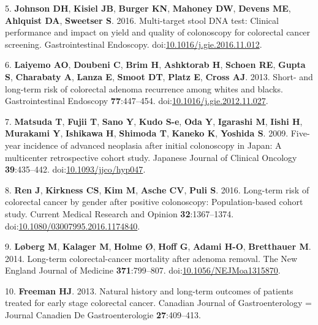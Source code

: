 \documentclass[12pt,]{article}
\begin{document}
\hypertarget{ref-johnson_multi-target_2016}{}
5. \textbf{Johnson DH}, \textbf{Kisiel JB}, \textbf{Burger KN},
\textbf{Mahoney DW}, \textbf{Devens ME}, \textbf{Ahlquist DA},
\textbf{Sweetser S}. 2016. Multi-target stool DNA test: Clinical
performance and impact on yield and quality of colonoscopy for
colorectal cancer screening. Gastrointestinal Endoscopy.
doi:\href{https://doi.org/10.1016/j.gie.2016.11.012}{10.1016/j.gie.2016.11.012}.

\hypertarget{ref-laiyemo_short-_2013}{}
6. \textbf{Laiyemo AO}, \textbf{Doubeni C}, \textbf{Brim H},
\textbf{Ashktorab H}, \textbf{Schoen RE}, \textbf{Gupta S},
\textbf{Charabaty A}, \textbf{Lanza E}, \textbf{Smoot DT}, \textbf{Platz
E}, \textbf{Cross AJ}. 2013. Short- and long-term risk of colorectal
adenoma recurrence among whites and blacks. Gastrointestinal Endoscopy
\textbf{77}:447--454.
doi:\href{https://doi.org/10.1016/j.gie.2012.11.027}{10.1016/j.gie.2012.11.027}.

\hypertarget{ref-matsuda_five-year_2009}{}
7. \textbf{Matsuda T}, \textbf{Fujii T}, \textbf{Sano Y}, \textbf{Kudo
S-e}, \textbf{Oda Y}, \textbf{Igarashi M}, \textbf{Iishi H},
\textbf{Murakami Y}, \textbf{Ishikawa H}, \textbf{Shimoda T},
\textbf{Kaneko K}, \textbf{Yoshida S}. 2009. Five-year incidence of
advanced neoplasia after initial colonoscopy in Japan: A multicenter
retrospective cohort study. Japanese Journal of Clinical Oncology
\textbf{39}:435--442.
doi:\href{https://doi.org/10.1093/jjco/hyp047}{10.1093/jjco/hyp047}.

\hypertarget{ref-ren_long-term_2016}{}
8. \textbf{Ren J}, \textbf{Kirkness CS}, \textbf{Kim M}, \textbf{Asche
CV}, \textbf{Puli S}. 2016. Long-term risk of colorectal cancer by
gender after positive colonoscopy: Population-based cohort study.
Current Medical Research and Opinion \textbf{32}:1367--1374.
doi:\href{https://doi.org/10.1080/03007995.2016.1174840}{10.1080/03007995.2016.1174840}.

\hypertarget{ref-loberg_long-term_2014}{}
9. \textbf{Løberg M}, \textbf{Kalager M}, \textbf{Holme Ø}, \textbf{Hoff
G}, \textbf{Adami H-O}, \textbf{Bretthauer M}. 2014. Long-term
colorectal-cancer mortality after adenoma removal. The New England
Journal of Medicine \textbf{371}:799--807.
doi:\href{https://doi.org/10.1056/NEJMoa1315870}{10.1056/NEJMoa1315870}.

\hypertarget{ref-freeman_natural_2013}{}
10. \textbf{Freeman HJ}. 2013. Natural history and long-term outcomes of
patients treated for early stage colorectal cancer. Canadian Journal of
Gastroenterology = Journal Canadien De Gastroenterologie
\textbf{27}:409--413.
\end{document}
